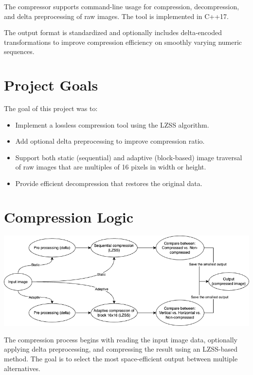 \documentclass[a4paper,12pt]{article}
\begin{document}
    The compressor supports command-line usage for compression, decompression, and delta preprocessing of raw
    images. The tool is implemented in C++17.

    The output format is standardized and optionally includes delta-encoded transformations to improve compression efficiency on smoothly varying numeric sequences.


    \section{Project Goals}
    The goal of this project was to:
    \begin{itemize}
        \item Implement a lossless compression tool using the LZSS algorithm.
        \item Add optional delta preprocessing to improve compression ratio.
        \item Support both static (sequential) and adaptive (block-based) image traversal of raw images that are
        multiples of 16 pixels in width or height.
        \item Provide efficient decompression that restores the original data.
    \end{itemize}


    \section{Compression Logic}

    \includegraphics[width=1\textwidth]{template-fig/compressor}\par\vspace{1cm}

    The compression process begins with reading the input image data, optionally applying delta preprocessing, and compressing the result using an LZSS-based method. The goal is to select the most space-efficient output between multiple alternatives.
\end{document}
